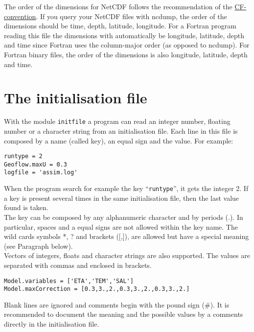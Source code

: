 \documentclass[a4paper,12pt]{article}
\newcommand{\code}{\texttt}
\begin{document}
The order of the dimensions for NetCDF follows the recommendation of the  \href{http://cf-pcmdi.llnl.gov/documents/cf-conventions/1.6/cf-conventions.html\#dimensions}{CF-convention}. If you query your NetCDF files with ncdump, the order of the dimensions should be time, depth, latitude, longitude. For a Fortran program reading this file the dimensions with automatically be longitude, latitude, depth and time since Fortran uses the column-major order (as opposed to ncdump). For Fortran binary files, the order of the dimensions is also longitude, latitude, depth and time.

\section{The initialisation file}

With the module \code{initfile} a program can read an integer number,
floating number or a character string from an initialisation file.  Each line in
this file is composed by a name (called key), an equal sign and the value. For
example:

\begin{verbatim}
runtype = 2
Geoflow.maxU = 0.3 
logfile = 'assim.log' 
\end{verbatim} 

When the program search for example the key ``\code{runtype}'', it gets
the integer 2. If a key is present several times in the same
initialisation file, then the last value found is taken. \\

The key can be composed by any alphanumeric character and by periods (.).
In particular, spaces and a equal signs are not allowed within the key
name. The wild cards symbols *, ? and brackets ([,]), are allowed but have
a special meaning (see Paragraph below). \\

Vectors of integers, floats and character strings are also supported. The
values are separated with commas and enclosed in brackets.

\begin{verbatim}
Model.variables = ['ETA','TEM','SAL'] 
Model.maxCorrection = [0.3,3.,2.,0.3,3.,2.,0.3,3.,2.] 
\end{verbatim} 

Blank lines are ignored and comments begin with the pound sign (\#).
It is recommended to document the meaning and the possible values
by a comments directly in the initialisation file. \\
\end{document}
